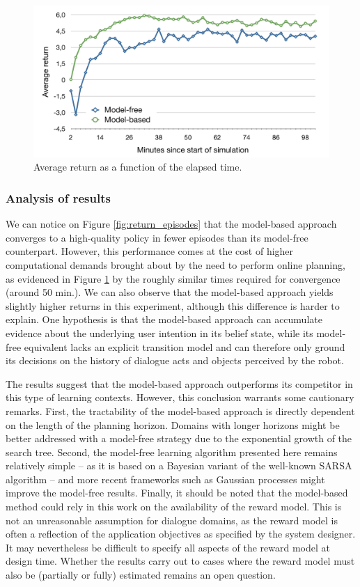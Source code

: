 \begin{figure}[p]
\centering
\includegraphics[scale=0.42]{imgs/timing.pdf}
\caption{Average return as a function of the elapsed time.}
\label{fig:return_time}
\end{figure}

\subsubsection*{Analysis of results}

We can notice on Figure \ref{fig:return_episodes} that the model-based approach converges to a high-quality policy in fewer episodes than its model-free counterpart.  However, this performance comes at the cost of higher computational demands brought about by the need to perform online planning, as evidenced in Figure \ref{fig:return_time} by the roughly similar times required for convergence (around 50 min.). We can also observe that the model-based approach yields slightly higher returns in this experiment, although this difference is harder to explain.  One hypothesis is that the model-based approach can accumulate evidence about the underlying user intention in its belief state, while its model-free equivalent lacks an explicit transition model and can therefore only ground its decisions on the history of dialogue acts and objects perceived by the robot.

The results suggest that the model-based approach outperforms its competitor in this type of learning contexts. However, this conclusion warrants some cautionary remarks.   First, the tractability of the model-based approach is directly dependent on the length of the planning horizon. Domains with longer horizons might be better addressed with a model-free strategy due to the exponential growth of the search tree. Second, the model-free learning algorithm presented here remains relatively simple -- as it is based on a Bayesian variant of the well-known SARSA algorithm -- and more recent frameworks such as Gaussian processes \citep{milica2013} might improve the model-free results. Finally, it should be noted that the model-based method could rely in this work on the availability of the reward model. This is not an unreasonable assumption for dialogue domains, as the reward model is often a reflection of the application objectives as specified by the system designer. It may nevertheless be difficult to specify all aspects of the reward model at design time. Whether the results carry out to cases where the reward model must also be (partially or fully) estimated remains an open question.


